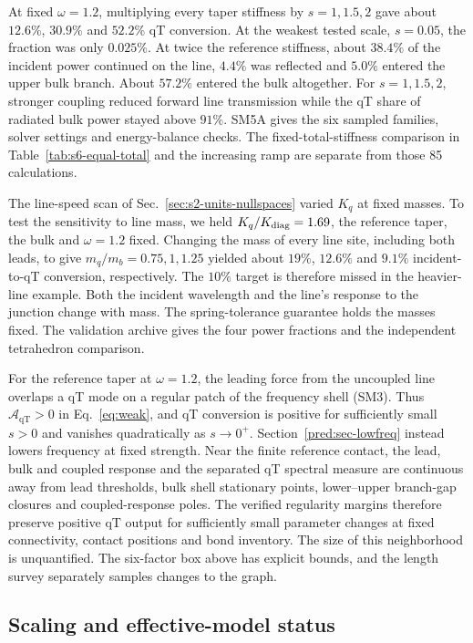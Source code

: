 \documentclass[10pt,aps,onecolumn,floatfix,notitlepage,nofootinbib,showkeys]{revtex4-2}
\newcommand{\qT}{\mathrm{qT}}
\begin{document}
At fixed $\omega=1.2$, multiplying every taper stiffness by $s=1,1.5,2$ gave about $12.6\%$, $30.9\%$ and $52.2\%$ qT conversion. At the weakest tested scale, $s=0.05$, the fraction was only $0.025\%$. At twice the reference stiffness, about $38.4\%$ of the incident power continued on the line, $4.4\%$ was reflected and $5.0\%$ entered the upper bulk branch. About $57.2\%$ entered the bulk altogether. For $s=1,1.5,2$, stronger coupling reduced forward line transmission while the qT share of radiated bulk power stayed above $91\%$. SM5A gives the six sampled families, solver settings and energy-balance checks. The fixed-total-stiffness comparison in Table~\ref{tab:s6-equal-total} and the increasing ramp are separate from those 85 calculations.

The line-speed scan of Sec.~\ref{sec:s2-units-nullspaces} varied $K_q$ at fixed masses. To test the sensitivity to line mass, we held $K_q/K_{\rm diag}=1.69$, the reference taper, the bulk and $\omega=1.2$ fixed. Changing the mass of every line site, including both leads, to give $m_q/m_b=0.75,1,1.25$ yielded about $19\%$, $12.6\%$ and $9.1\%$ incident-to-qT conversion, respectively. The $10\%$ target is therefore missed in the heavier-line example. Both the incident wavelength and the line's response to the junction change with mass. The spring-tolerance guarantee holds the masses fixed. The validation archive gives the four power fractions and the independent tetrahedron comparison.

For the reference taper at $\omega=1.2$, the leading force from the uncoupled line overlaps a qT mode on a regular patch of the frequency shell (SM3). Thus $\mathcal A_{\qT}>0$ in Eq.~\eqref{eq:weak}, and qT conversion is positive for sufficiently small $s>0$ and vanishes quadratically as $s\to0^+$. Section~\ref{pred:sec-lowfreq} instead lowers frequency at fixed strength. Near the finite reference contact, the lead, bulk and coupled response and the separated qT spectral measure are continuous away from lead thresholds, bulk shell stationary points, lower--upper branch-gap closures and coupled-response poles. The verified regularity margins therefore preserve positive qT output for sufficiently small parameter changes at fixed connectivity, contact positions and bond inventory. The size of this neighborhood is unquantified. The six-factor box above has explicit bounds, and the length survey separately samples changes to the graph.

\subsection{Scaling and effective-model status}
\label{sec:s9-scaling-scope}
\end{document}
